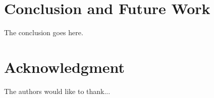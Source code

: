 \documentclass[conference]{IEEEtran}
\begin{document}
\section{Conclusion and Future Work}
The conclusion goes here.
 





\section*{Acknowledgment}
The authors would like to thank...



{\small}
 
\end{document}
